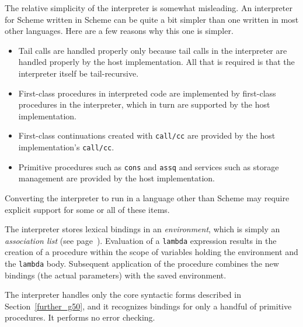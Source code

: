 The relative simplicity of the interpreter is somewhat misleading.
An interpreter for Scheme written in Scheme can be quite a bit simpler
than one written in most other languages.
Here are a few reasons why this one is simpler.

\begin{itemize}
\item 
Tail calls are handled properly only because tail calls
in the interpreter are handled properly by the host implementation.
All that is required is that the interpreter itself be tail-recursive.

\item 
First-class procedures in interpreted code are implemented
by first-class procedures in the interpreter, which in turn are
supported by the host implementation.

\item 
First-class continuations created with \texttt{call/cc} are provided by the
host implementation's \texttt{call/cc}.

\item 
Primitive procedures such as \texttt{cons} and \texttt{assq} and services such as
storage management are provided by the host implementation.

\end{itemize}


Converting the interpreter to run in a language other than
Scheme may require explicit support for some or all of these
items.


The interpreter stores lexical bindings in an \label{examples_s49}\textit{environment}, which
is simply an \label{examples_s50}\textit{association list}
(see page \pageref{objects_page_assq}).
Evaluation of a \texttt{lambda} expression results in the creation of a procedure
within the scope of variables holding the environment and the \texttt{lambda} body.
Subsequent application of the procedure combines the new bindings (the
actual parameters) with the saved environment.


The interpreter handles only the \label{examples_s51}core syntactic forms described in
Section \ref{further_g50}, and it recognizes bindings for only a handful
of primitive procedures.
It performs no error checking.


